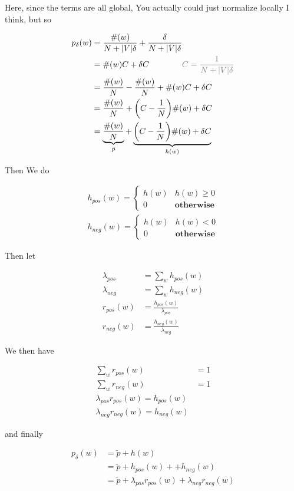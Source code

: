 \documentclass{article}
\begin{document}
	Here, since the terms are all global, You actually could just normalize locally I think, but so
	
	\begin{align}
		p_{\delta}(w) &= \frac{\#(w)}{N + |V|\delta} + \frac{\delta}{N + |V|\delta}\\
		&= \#(w)C + \delta C\qquad\qquad {\color{gray} C=\frac{1}{N+|V|\delta}}\\
		&= \frac{\#(w)}{N} - \frac{\#(w)}{N} + \#(w)C + \delta C\\
		&= \frac{\#(w)}{N} + \bigg(C - \frac{1}{N}\bigg)\#(w) + \delta C\\
		&= \underbrace{\frac{\#(w)}{N}}_{\tilde{p}} + \underbrace{\bigg(C - \frac{1}{N}\bigg)\#(w) + \delta C}_{h(w)}
	\end{align}
	
	Then We do
	
	\begin{align}
		h_{pos}(w) = \begin{cases} h(w) & h(w) \geq 0\\
								0 &\textbf{otherwise}
					\end{cases}\\
		h_{neg}(w) = \begin{cases} h(w) & h(w) < 0\\
								0 &\textbf{otherwise}
					\end{cases}
	\end{align}
	    
	Then let 
	
	\begin{align}
		\lambda_{pos} &= \sum_w h_{pos}(w)\\
		\lambda_{neg} &= \sum_w h_{neg}(w)\\
		r_{pos}(w) &= \frac{h_{pos}(w)}{\lambda_{pos}}\\
		r_{neg}(w) &= \frac{h_{neg}(w)}{\lambda_{neg}}
	\end{align}
	
	We then have
	
	\begin{align}
		\sum_w r_{pos}(w) &= 1\\
		\sum_w r_{neg}(w) &= 1\\
		\lambda_{pos}r_{pos}(w) = h_{pos}(w)\\
		\lambda_{neg}r_{neg}(w) = h_{neg}(w)
	\end{align}
	
	and finally
	
	\begin{align}
		p_\delta(w) &= \tilde{p} + h(w)\\
		&= \tilde{p} + h_{pos}(w) + + h_{neg}(w)\\
		&= \tilde{p} + \lambda_{pos}r_{pos}(w) + \lambda_{neg}r_{neg}(w)
	\end{align}
	
\end{document}
